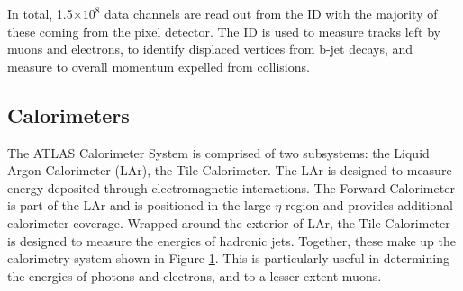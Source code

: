 In total, 1.5$\times10^{8}$ data channels are read out from the ID with the majority of these coming from the pixel detector.
The ID is used to measure tracks left by muons and electrons, to identify displaced vertices from b-jet decays, and measure to overall momentum expelled from collisions.

\subsection{Calorimeters}

\begin{figure}[h!]
\captionsetup[subfigure]{position=b}
\centering
{}
\caption{}
\label{fig:atlasCalo}
\end{figure}

The ATLAS Calorimeter System is comprised of two subsystems: the Liquid Argon Calorimeter (LAr), the Tile Calorimeter.
The LAr is designed to measure energy deposited through electromagnetic interactions.
The Forward Calorimeter is part of the LAr and is positioned in the large-$\eta$ region and provides additional calorimeter coverage.
Wrapped around the exterior of LAr, the Tile Calorimeter is designed to measure the energies of hadronic jets.
Together, these make up the calorimetry system shown in Figure \ref{fig:atlasCalo}.
This is particularly useful in determining the energies of photons and electrons, and to a lesser extent muons.

